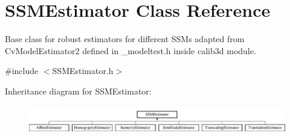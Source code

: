 \hypertarget{classSSMEstimator}{\section{S\-S\-M\-Estimator Class Reference}
\label{classSSMEstimator}
}


Base class for robust estimators for different S\-S\-Ms adapted from Cv\-Model\-Estimator2 defined in \-\_\-modeltest.\-h inside calib3d module.  




{\ttfamily \#include $<$S\-S\-M\-Estimator.\-h$>$}

Inheritance diagram for S\-S\-M\-Estimator\-:\begin{figure}[H]
\begin{center}
\leavevmode
\includegraphics[height=1.305361cm]{classSSMEstimator}
\end{center}
\end{figure}
